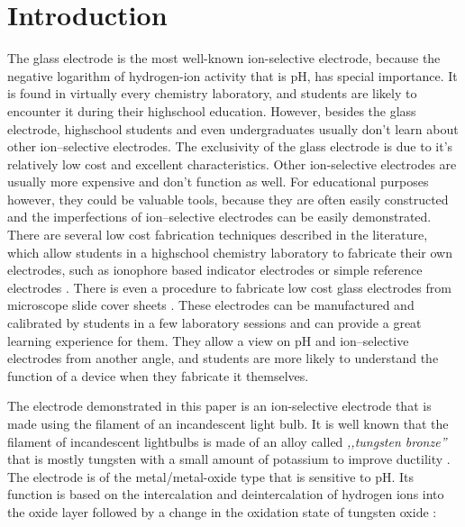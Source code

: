 \documentclass[manuscript=article, journal=jceda8]{achemso}
\begin{document}
\section{Introduction}

The glass electrode is the most well-known ion-selective electrode, because the negative logarithm of hydrogen-ion activity that is pH, has special importance. 
It is found in virtually every chemistry laboratory, and students are likely to encounter it during their highschool education. However, besides the glass electrode, highschool students and even undergraduates usually don't learn about other ion--selective electrodes. 
The exclusivity of the glass electrode is due to it's relatively low cost and excellent characteristics. Other ion-selective electrodes are usually more expensive and don't function as well. For educational purposes however, they could be valuable tools, because they are often easily constructed and the imperfections of ion--selective electrodes can be easily demonstrated. There are several low cost fabrication techniques described in the literature, which allow students in a highschool chemistry laboratory to fabricate their own electrodes, such as ionophore based indicator electrodes \cite{goldcamp2010inexpensive, marafie2007plastic} or simple reference electrodes \cite{riyazuddin1994low}. There is even a procedure to fabricate low cost glass electrodes from microscope slide cover sheets \cite{yong2019simple}. These electrodes can be manufactured and calibrated by students in a few laboratory sessions and can provide a great learning experience for them. They allow a view on pH and ion--selective electrodes from another angle, and students are more likely to understand the function of a device when they fabricate it themselves.

The electrode demonstrated in this paper is an ion-selective electrode that is made using the filament of an incandescent light bulb. It is well known that the filament of incandescent lightbulbs is made of an alloy called \emph{,,tungsten bronze''} that is mostly tungsten with a small amount of potassium to improve ductility \cite{cisternas2015electrode, wechter1972use, schade2010100}. The electrode is of the metal/metal-oxide type that is sensitive to pH. Its function is based on the intercalation and deintercalation of hydrogen ions into the oxide layer followed by a change in the oxidation state of tungsten oxide \cite{fenster2008single}:
\end{document}

